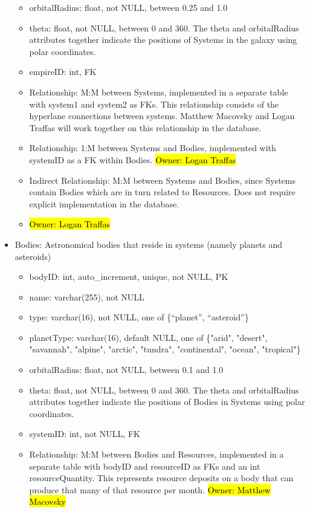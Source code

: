 \documentclass[12pt]{article}
\begin{document}
\begin{itemize}
\begin{itemize}
        \item orbitalRadius: float, not NULL, between 0.25 and 1.0
        \item theta: float, not NULL, between 0 and 360. The theta and orbitalRadius attributes together indicate the positions of Systems in the galaxy using polar coordinates.
        \item empireID: int, FK
        \item Relationship: M:M between Systems, implemented in a separate table with system1 and system2 as FKs. This relationship consists of the hyperlane connections between systems. Matthew Macovsky and Logan Traffas will work together on this relationship in the database. 
        \item Relationship: 1:M between Systems and Bodies, implemented with systemID as a FK within Bodies. \hl{Owner: Logan Traffas}
        \item Indirect Relationship: M:M between Systems and Bodies, since Systems contain Bodies which are in turn related to Resources. Does not require explicit implementation in the database.
        \item \hl{Owner: Logan Traffas}
    \end{itemize}
    \item Bodies: Astronomical bodies that reside in systems (namely planets and asteroids)
    \begin{itemize}
        \item bodyID: int, auto\_increment, unique, not NULL, PK
        \item name: varchar(255), not NULL
        \item type: varchar(16), not NULL, one of \{“planet”, “asteroid”\}
        \item planetType: varchar(16), default NULL, one of \{"arid", "desert", "savannah", "alpine", "arctic", "tundra", "continental", "ocean", "tropical"\}
        \item orbitalRadius: float, not NULL, between 0.1 and 1.0
        \item theta: float, not NULL, between 0 and 360. The theta and orbitalRadius attributes together indicate the positions of Bodies in Systems using polar coordinates.
        \item systemID: int, not NULL, FK
        \item Relationship: M:M between Bodies and Resources, implemented in a separate table with bodyID and resourceID as FKs and an int resourceQuantity. This represents resource deposits on a body that can produce that many of that resource per month. \hl{Owner: Matthew Macovsky}

\end{itemize}
\end{itemize}
\end{document}
